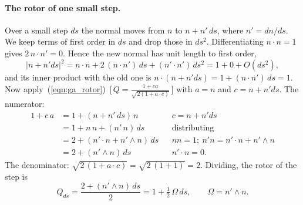 \paragraph{The rotor of one small step.} Over a small step $ds$ the normal moves from $n$ to $n + n'\,ds$, where $n' = dn/ds$. We keep terms of first order in $ds$ and drop those in $ds^2$. Differentiating $n\cdot n = 1$ gives $2\,n\cdot n' = 0$. Hence the new normal has unit length to first order,
\begin{equation*}
|n + n'ds|^2 = n\cdot n + 2\,(n\cdot n')\, ds + (n'\cdot n')\, ds^2 = 1 + 0 + O(ds^2) ,
\end{equation*}
and its inner product with the old one is $n\cdot(n + n'ds) = 1 + (n\cdot n')\,ds = 1$. Now apply~(\ref{eqn:ga_rotor})~[\,$Q = \frac{1 + ca}{\sqrt{2(1 + a\cdot c)}}$\,] with $a = n$ and $c = n + n'ds$. The numerator:
\begin{align*}
1 + c\,a &= 1 + (n + n'\,ds)\, n && c = n + n'ds \\
&= 1 + n\,n + (n'\,n)\, ds && \text{distributing} \\
&= 2 + (n'\cdot n + n'\wedge n)\, ds && n n = 1;\ n'n = n'\cdot n + n'\wedge n \\
&= 2 + (n'\wedge n)\, ds && n'\cdot n = 0 .
\end{align*}
The denominator: $\sqrt{2\,(1 + a\cdot c)} = \sqrt{2\,(1 + 1)} = 2$. Dividing, the rotor of the step is
\begin{equation*}
Q_{ds} = \frac{2 + (n'\wedge n)\, ds}{2} = 1 + \tfrac12\,\Omega\, ds, \qquad \Omega = n'\wedge n .
\end{equation*}

